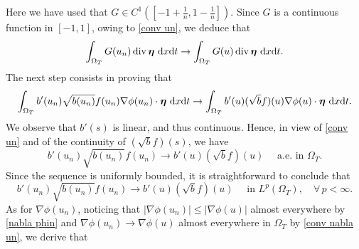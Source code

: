 \documentclass[11pt,  reqno]{amsart}%
\theoremstyle{plain}
\theoremstyle{definition}
\theoremstyle{remark}
\numberwithin{equation}{section}
\def\div{\,\mathrm{div}}
\newcommand{\dx}{\textup{d}x}
\newcommand{\dt}{\textup{d}t}
\begin{document}
Here we have used that $G \in C^1\left(\left[ -1+\frac{1}{n},1-\frac{1}{n}\right]\right)$.
Since $G$ is a continuous function in $[-1,1]$, owing to \eqref{conv un}, we deduce that
\begin{equation}
\label{road to nabla G 1}
\int_{\Omega_T}  G(u_n)\div \, \boldsymbol{\eta} \ \dx \dt \to \int_{\Omega_T}  G(u)\div \, \boldsymbol{\eta} \ \dx \dt.
\end{equation}
The next step consists in proving that
\begin{equation}
    \label{road to nabla G 2}
    \int_{\Omega_T}b'(u_n)\sqrt{b(u_n)}f(u_n) \nabla \phi(u_n)\cdot \boldsymbol{\eta} \ \dx \dt \to \int_{\Omega_T}b'(u) (\sqrt{b}f)(u) \nabla \phi(u)\cdot \boldsymbol{\eta} \ \dx \dt.
\end{equation}
We observe that $b'(s)$ is linear, and thus continuous. 
Hence, in view of \eqref{conv un} and of the continuity of $(\sqrt{b}f)(s)$, we have
$$b'(u_n)\sqrt{b(u_n)}f(u_n) \to b'(u) (\sqrt{b}f) (u)  \quad \mbox{ a.e. in }\Omega_T.$$
Since the sequence is uniformly bounded, it is straightforward to conclude that
\begin{equation}
    \label{conv b'sqrt b f}
    b'(u_n)\sqrt{b(u_n)}f(u_n) \to b'(u) (\sqrt{b}f) (u)  \quad \mbox{ in }L^p( \Omega_T), \quad \forall \, p < \infty.
\end{equation}
As for $\nabla \phi(u_n)$, noticing that $|\nabla \phi(u_n)| \leq |\nabla \phi(u)|$ almost everywhere by \eqref{nabla phin} and $\nabla \phi(u_n) \to \nabla \phi(u)$ almost everywhere in $\Omega_T$ by \eqref{conv nabla un}, we derive that
\end{document}

